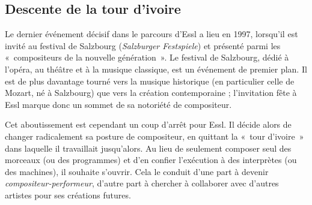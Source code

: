 \documentclass[a4paper,12pt]{article}
\newcommand{\guill}[1]{«~#1~»}
\newcommand{\zitat}[2]{\#Citation(#2)\#}
\begin{document}



\subsection{Descente de la tour d'ivoire}
\label{liberte}

Le dernier événement décisif dans le parcours d'Essl a lieu en 1997, lorsqu'il est invité au festival de Salzbourg (\emph{Salzburger Festspiele}) et présenté parmi les \guill{compositeurs de la nouvelle génération}. Le festival de Salzbourg, dédié à l'opéra, au théâtre et à la musique classique, est un événement de premier plan. Il est de plus davantage tourné vers la musique historique (en particulier celle de Mozart, né à Salzbourg) que vers la création contemporaine ; l'invitation fête à Essl marque donc un sommet de sa notoriété de compositeur.

Cet aboutissement est cependant un coup d'arrêt pour Essl. Il décide alors de changer radicalement sa posture de compositeur, en quittant la \guill{tour d'ivoire} dans laquelle il travaillait jusqu'alors. Au lieu de seulement composer seul des morceaux (ou des programmes) et d'en confier l'exécution à des interprètes (ou des machines), il souhaite s'ouvrir. Cela le conduit d'une part à devenir \emph{compositeur-performeur}, d'autre part à chercher à collaborer avec d'autres artistes pour ses créations futures.
\end{document}
